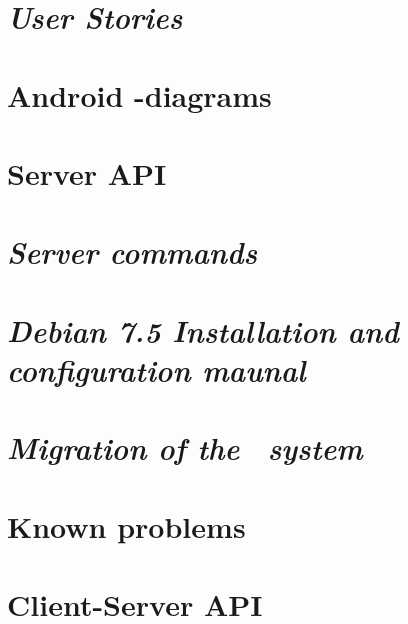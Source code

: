 \begin{appendix}

\chapter{\textit{User Stories}}

\chapter{Android -diagrams}

\chapter{Server API}

\chapter{\textit{Server commands}}

%
\chapter{\textit{Debian 7.5 Installation and configuration maunal}}

\chapter{\textit{Migration of the \appName\ system}}

\chapter{Known problems}
\label{chap:knownProblems}

\chapter{Client-Server API}

\end{appendix}
